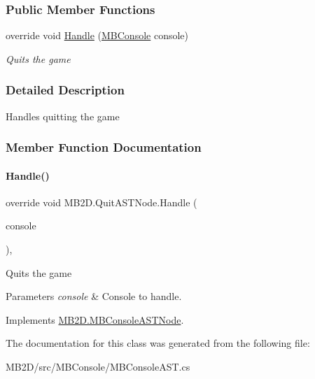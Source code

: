 \subsubsection*{Public Member Functions}
\begin{DoxyCompactItemize}
\item 
override void \hyperlink{class_m_b2_d_1_1_quit_a_s_t_node_a42a27d409a04151393bedcfff8ca5a3c}{Handle} (\hyperlink{class_m_b2_d_1_1_m_b_console}{M\+B\+Console} console)
\begin{DoxyCompactList}\small\item\em Quits the game \end{DoxyCompactList}\end{DoxyCompactItemize}


\subsubsection{Detailed Description}
Handles quitting the game 



\subsubsection{Member Function Documentation}
\hypertarget{class_m_b2_d_1_1_quit_a_s_t_node_a42a27d409a04151393bedcfff8ca5a3c}{}\label{class_m_b2_d_1_1_quit_a_s_t_node_a42a27d409a04151393bedcfff8ca5a3c} 
\paragraph{\texorpdfstring{Handle()}{Handle()}}
{\footnotesize\ttfamily override void M\+B2\+D.\+Quit\+A\+S\+T\+Node.\+Handle (\begin{DoxyParamCaption}\item[{\hyperlink{class_m_b2_d_1_1_m_b_console}{M\+B\+Console}}]{console }\end{DoxyParamCaption})\hspace{0.3cm}{\ttfamily [inline]}, {\ttfamily [virtual]}}



Quits the game 


\begin{DoxyParams}{Parameters}
{\em console} & Console to handle.\\
\hline
\end{DoxyParams}


Implements \hyperlink{class_m_b2_d_1_1_m_b_console_a_s_t_node_aa70a49e61ab623698af4ed8fda4ebbf5}{M\+B2\+D.\+M\+B\+Console\+A\+S\+T\+Node}.



The documentation for this class was generated from the following file\+:\begin{DoxyCompactItemize}
\item 
M\+B2\+D/src/\+M\+B\+Console/M\+B\+Console\+A\+S\+T.\+cs\end{DoxyCompactItemize}
